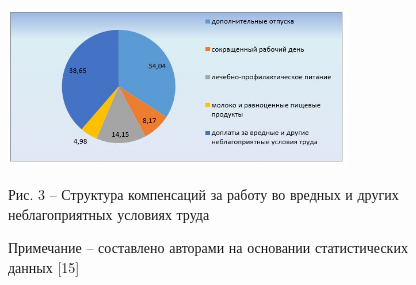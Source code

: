 \begin{figure}[H]
	\centering
	\includegraphics[width=0.8\textwidth]{media/ekon/image5.3}
	\caption*{Рис. 3 -- Структура компенсаций за работу во вредных и других
  неблагоприятных условиях труда}
  \caption*{Примечание -- составлено авторами на основании статистических
  данных {[}15{]}}
\end{figure}

